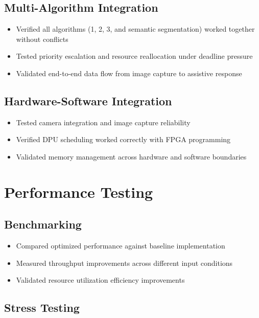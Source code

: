 \subsection{Multi-Algorithm Integration}\label{subsec:multi-algorithm-integration}

\begin{itemize}
\item Verified all algorithms (1, 2, 3, and semantic segmentation) worked together without conflicts
\item Tested priority escalation and resource reallocation under deadline pressure
\item Validated end-to-end data flow from image capture to assistive response
\end{itemize}

\subsection{Hardware-Software Integration}\label{subsec:hardware-software-integration}

\begin{itemize}
\item Tested camera integration and image capture reliability
\item Verified DPU scheduling worked correctly with FPGA programming
\item Validated memory management across hardware and software boundaries
\end{itemize}

\section{Performance Testing}\label{sec:performance-testing}

\subsection{Benchmarking}\label{subsec:benchmarking}

\begin{itemize}
\item Compared optimized performance against baseline implementation
\item Measured throughput improvements across different input conditions
\item Validated resource utilization efficiency improvements
\end{itemize}

\subsection{Stress Testing}\label{subsec:stress-testing}

